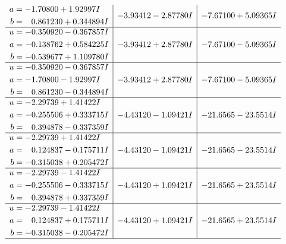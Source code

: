 \documentclass[1p]{elsarticle_modified}
\theoremstyle{definition}
\begin{document}
$$\begin{array}{c|c|c}
\begin{aligned}
a &= -1.70800 + 1.92997 I \\
b &= \phantom{-}0.861230 + 0.344894 I\end{aligned}
 & -3.93412 - 2.87780 I & -7.67100 + 5.09365 I \\ \hline\begin{aligned}
u &= -0.350920 - 0.367857 I \\
a &= -0.138762 + 0.584225 I \\
b &= -0.539677 + 1.109780 I\end{aligned}
 & -3.93412 + 2.87780 I & -7.67100 - 5.09365 I \\ \hline\begin{aligned}
u &= -0.350920 - 0.367857 I \\
a &= -1.70800 - 1.92997 I \\
b &= \phantom{-}0.861230 - 0.344894 I\end{aligned}
 & -3.93412 + 2.87780 I & -7.67100 - 5.09365 I \\ \hline\begin{aligned}
u &= -2.29739 + 1.41422 I \\
a &= -0.255506 + 0.333715 I \\
b &= \phantom{-}0.394878 - 0.337359 I\end{aligned}
 & -4.43120 - 1.09421 I & -21.6565 - 23.5514 I \\ \hline\begin{aligned}
u &= -2.29739 + 1.41422 I \\
a &= \phantom{-}0.124837 - 0.175711 I \\
b &= -0.315038 + 0.205472 I\end{aligned}
 & -4.43120 - 1.09421 I & -21.6565 - 23.5514 I \\ \hline\begin{aligned}
u &= -2.29739 - 1.41422 I \\
a &= -0.255506 - 0.333715 I \\
b &= \phantom{-}0.394878 + 0.337359 I\end{aligned}
 & -4.43120 + 1.09421 I & -21.6565 + 23.5514 I \\ \hline\begin{aligned}
u &= -2.29739 - 1.41422 I \\
a &= \phantom{-}0.124837 + 0.175711 I \\
b &= -0.315038 - 0.205472 I\end{aligned}
 & -4.43120 + 1.09421 I & -21.6565 + 23.5514 I\\
 \hline 
 \end{array}$$\newpage
\end{document}
